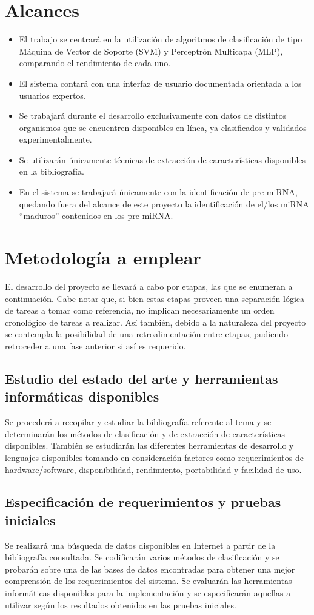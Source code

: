 \documentclass[12pt,bibliography=oldstyle,DIV=14,parskip=full-,titlepage]{scrartcl}
\begin{document}
\section{Alcances}
\begin{itemize}
\item El trabajo se centrará en la utilización de algoritmos de
  clasificación de tipo Máquina de Vector de Soporte (SVM) y
  Perceptrón Multicapa (MLP), comparando el rendimiento de cada uno.
\item El sistema contará con una interfaz de usuario
  documentada orientada a los usuarios expertos.
\item Se trabajará durante el desarrollo exclusivamente con datos de
  distintos organismos que se encuentren disponibles en línea, ya
  clasificados y validados experimentalmente.
\item Se utilizarán únicamente técnicas de extracción de
  características disponibles en la bibliografía.
\item En el sistema se trabajará únicamente con la identificación de
  pre-miRNA, quedando fuera del alcance de este proyecto la
  identificación de el/los miRNA ``maduros'' contenidos en los pre-miRNA.
\end{itemize}
%
%
\section{Metodología a emplear}
El desarrollo del proyecto se llevará a cabo por etapas, las que se
enumeran a continuación.  Cabe notar que, si bien estas etapas proveen
una separación lógica de tareas a tomar como referencia, no implican
necesariamente un orden cronológico de tareas a realizar. Así también,
debido a la naturaleza del proyecto se contempla la posibilidad de una
retroalimentación entre etapas, pudiendo retroceder a una fase
anterior si así es requerido.
%
\subsection{Estudio del estado del arte y herramientas informáticas
  disponibles}
Se procederá a recopilar y estudiar la bibliografía referente al tema
y se determinarán los métodos de clasificación y de extracción de
características disponibles. También se estudiarán las diferentes
herramientas de desarrollo y lenguajes disponibles tomando en
consideración factores como requerimientos de hardware/software,
disponibilidad, rendimiento, portabilidad y facilidad de uso.
%
\subsection{Especificación de requerimientos y pruebas iniciales}
Se realizará una búsqueda de datos disponibles en Internet a partir de
la bibliografía consultada.  Se codificarán varios métodos de
clasificación y se probarán sobre una de las bases de datos
encontradas para obtener una mejor comprensión de los requerimientos
del sistema.
%
Se evaluarán las herramientas informáticas disponibles para la
implementación y se especificarán aquellas a utilizar según los
resultados obtenidos en las pruebas iniciales.
%
\end{document}
